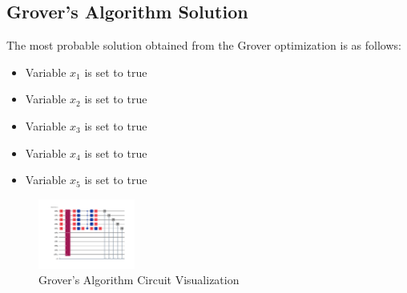 \documentclass{article}%
\begin{document}
%
\subsection{Grover's Algorithm Solution}%
\label{subsec:GroversAlgorithmSolution}%
The most probable solution obtained from the Grover optimization is as follows:\newline%
%
\begin{itemize}%
\item Variable \( x_1 \) is set to true%
\item Variable \( x_2 \) is set to true%
\item Variable \( x_3 \) is set to true%
\item Variable \( x_4 \) is set to true%
\item Variable \( x_5 \) is set to true%
\end{itemize}

%


\begin{figure}[h!]%
\centering%
\includegraphics[width=120px]{quantum_circuit_grover.png}%
\caption{Grover's Algorithm Circuit Visualization}%
\end{figure}

%
\end{document}
